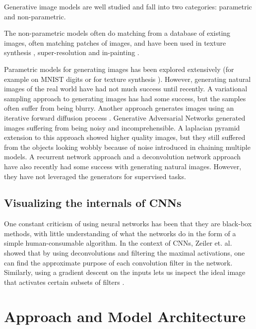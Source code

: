 \documentclass{article} \usepackage{iclr2016_conference,times}
\begin{document}
Generative image models are well studied and fall into two categories: parametric and non-parametric.

The non-parametric models often do matching from a database of existing images, often matching patches of images, and have been used in texture synthesis \citep{efros1999texture}, super-resolution \citep{freeman2002example} and in-painting \citep{hays2007scene}.

Parametric models for generating images has been explored extensively (for example on MNIST digits or for texture synthesis \citep{portilla2000parametric}). 
However, generating natural images of the real world have had not much success until recently. A variational sampling approach to generating images \citep{kingma2013auto} has had some success, but the samples often suffer from being blurry. Another approach generates images using an iterative forward diffusion process \citep{sohl2015deep}. Generative Adversarial Networks \citep{Goodfellow2014} generated images suffering from being noisy and incomprehensible. A laplacian pyramid extension to this approach \citep{denton2015deep} showed higher quality images, but they still suffered from the objects looking wobbly because of noise introduced in chaining multiple models. A recurrent network approach \citep{gregor2015draw} and a deconvolution network approach \citep{dosovitskiy2014learning} have also recently had some success with generating natural images. However, they have not leveraged the generators for supervised tasks.

\subsection{Visualizing the internals of CNNs}

One constant criticism of using neural networks has been that they are black-box methods, with little understanding of what the networks do in the form of a simple human-consumable algorithm. In the context of CNNs, Zeiler et. al. \citep{zeiler2014visualizing} showed that by using deconvolutions and filtering the maximal activations, one can find the approximate purpose of each convolution filter in the network. Similarly, using a gradient descent on the inputs lets us inspect the ideal image that activates certain subsets of filters \citep{Inceptionism2015}. 

\section{Approach and Model Architecture}
\end{document}
